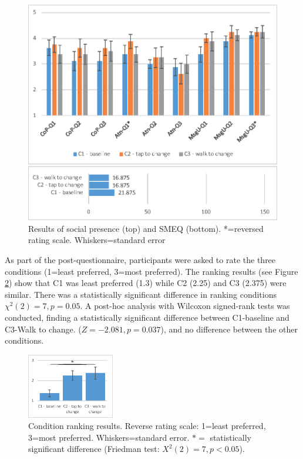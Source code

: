 \begin{figure}[h]
  \centering
  \includegraphics[width=\columnwidth]{images/chi/images-01.eps}
  \caption{Results of social presence (top) and SMEQ (bottom). *=reversed rating scale. Whiskers=standard error}
  \label{fig:data:results}
\end{figure}

As part of the post-questionnaire, participants were asked to rate the three conditions (1=least preferred, 3=most preferred). The ranking results (see Figure \ref{fig:data:ranking}) show that C1 was least preferred (1.3) while C2 (2.25) and C3 (2.375) were similar. There was a statistically significant difference in ranking conditions $\chi^2(2)=7, p=0.05$. A post-hoc analysis with Wilcoxon signed-rank tests was conducted, finding a statistically significant difference between C1-baseline and C3-Walk to change. ($Z=-2.081, p=0.037$), and no difference between the other conditions.

\begin{figure}[h]
  \centering
  \includegraphics[width=1.5in]{images/chi/images-05.eps}
  \caption{Condition ranking results. Reverse rating scale: 1=least preferred, 3=most preferred. Whiskers=standard error. $*=$ statistically significant difference (Friedman test: $X^2(2)=7, p<0.05$).}  
      \label{fig:data:ranking}
\end{figure}

